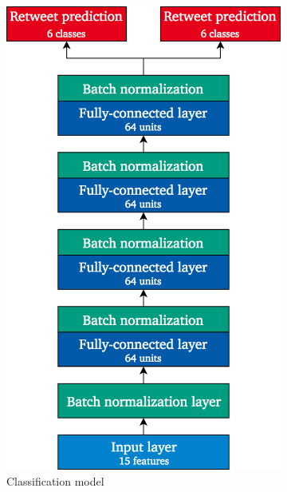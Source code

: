 \begin{figure}[h]
\centering
\begin{subfigure}{.4\textwidth}
  \centering
  \includegraphics[width=.95\linewidth]{img/deep_1_class_architecture}
  \caption{Classification model}
  \label{fig:deep1_architecture_1}
\end{subfigure}%
\begin{subfigure}{.4\textwidth}
  \centering

\end{subfigure}
\end{figure}

